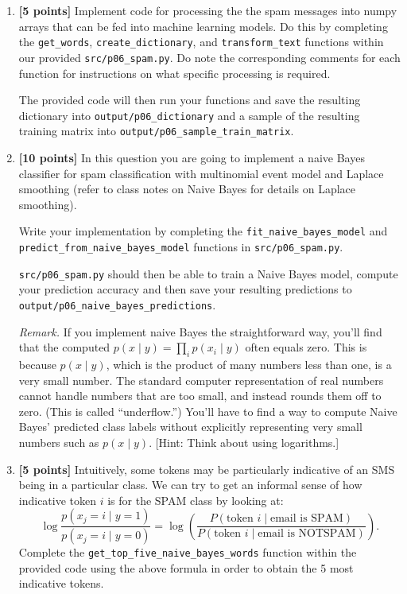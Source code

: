 \documentclass[11pt]{article}
\newcommand{\code}[1]{\nolinkurl{#1}}
\begin{document}
\begin{enumerate}
\item \textbf{[5 points]} Implement code for processing the the spam messages into numpy arrays that can be fed into machine learning models. Do this by completing the \code{get_words}, \code{create_dictionary}, and \code{transform_text} functions within our provided \code{src/p06_spam.py}. Do note the corresponding comments for each function for instructions on what specific processing is required.

The provided code will then run your functions and save the resulting dictionary into \code{output/p06_dictionary} and a sample of the resulting training matrix into \code{output/p06_sample_train_matrix}.
\item \textbf{[10 points]} In this question you are going to implement a naive Bayes classifier for spam classification with multinomial event model and Laplace smoothing (refer to class notes on Naive Bayes for details on Laplace smoothing).

Write your implementation by completing the \code{fit_naive_bayes_model} and \code{predict_from_naive_bayes_model} functions in \code{src/p06_spam.py}.

\code{src/p06_spam.py} should then be able to train a Naive Bayes model, compute your prediction accuracy and then save your resulting predictions to \code{output/p06_naive_bayes_predictions}.

\textit{Remark.} If you implement naive Bayes the straightforward way, you'll find that the computed $p(x\mid y)=\prod_i p(x_i\mid y)$ often equals zero. This is because $p(x\mid y)$, which is the product of many numbers less than one, is a very small number. The standard computer representation of real numbers cannot handle numbers that are too small, and instead rounds them off to zero. (This is called ``underflow.'') You'll have to find a way to compute Naive Bayes' predicted class labels without explicitly representing very small numbers such as $p(x\mid y)$. [Hint: Think about using logarithms.]
\item \textbf{[5 points]} Intuitively, some tokens may be particularly indicative of an SMS being in a particular class. We can try to get an informal sense of how indicative token $i$ is for the SPAM class by looking at:
\[\log\frac{p(x_j=i\mid y=1)}{p(x_j=i\mid y=0)}=\log\left(\frac{P(\text{token }i\mid\text{email is SPAM})}{P(\text{token }i\mid\text{email is NOTSPAM})}\right).\]
Complete the \code{get_top_five_naive_bayes_words} function within the provided code using the above formula in order to obtain the 5 most indicative tokens.


\end{enumerate}
\end{document}
